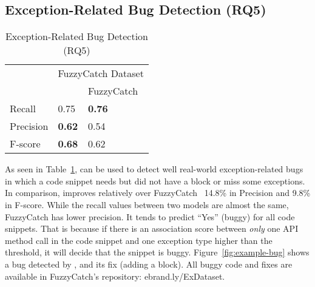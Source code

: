 \subsection{Exception-Related Bug Detection (RQ5)}
\label{sec:rq1}

\begin{table}[t]%
  \caption {Exception-Related Bug Detection (RQ5)}
  \vspace{-12pt}
  \small
	\begin{center}
		\renewcommand{\arraystretch}{1}
		\begin{tabular}{|p{1.75cm}<{\centering}|p{1.75cm}<{\centering}|p{1.75cm}<{\centering}|}
		  \hline
			\multirow{2}{*}{} & \multicolumn{2}{c|}{FuzzyCatch Dataset} \\
			\cline{2-3}
			  & \tool  & FuzzyCatch~\cite{xrank-fse20} \\
			\hline
			Recall    & 0.75 & \textbf{0.76}\\
			Precision & \textbf{0.62} & 0.54\\
			F-score   & \textbf{0.68} & 0.62\\
			\hline
		\end{tabular}
		\label{tab:bug}
	\end{center}
\end{table}



As seen in Table~\ref{tab:bug}, {\tool} can be used to detect well
real-world exception-related bugs in which a code snippet needs but
did not have a  block or miss some exceptions. In
comparison, {\tool} improves relatively over
FuzzyCatch~\cite{xrank-fse20} 14.8\% in Precision and
9.8\% in F-score.
While the recall values between two models are almost the same,
FuzzyCatch has lower precision. It tends to predict ``Yes'' (buggy)
for all code snippets. That is because if there is an association
score between {\em only} one API method call in the code snippet and
one exception type higher than the threshold, it will decide that the
snippet is buggy. Figure~\ref{fig:example-bug} shows a bug detected by
{\tool}, and its fix (adding a  block). All buggy code
and fixes are available in FuzzyCatch's repository:
ebrand.ly/ExDataset.




